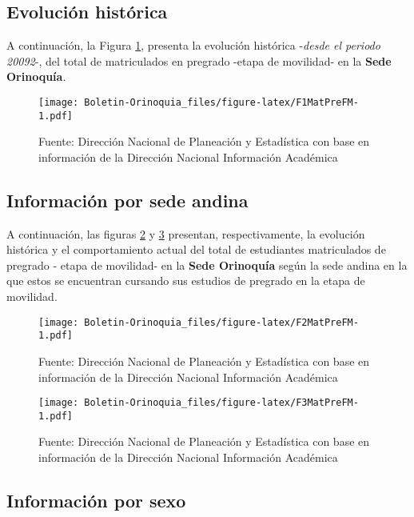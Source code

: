 \documentclass[
]{book}
\begin{document}
\hypertarget{evoluciuxf3n-histuxf3rica-4}{%
\subsection{Evolución histórica}\label{evoluciuxf3n-histuxf3rica-4}}

A continuación, la Figura \ref{fig:F1MatPreFM}, presenta la evolución histórica -\emph{desde el periodo 20092}-, del total de matriculados en pregrado -etapa de movilidad- en la \textbf{Sede Orinoquía}.

\begin{figure}
\centering
\texttt{[image: Boletin-Orinoquia\_files/figure-latex/F1MatPreFM-1.pdf]}
\caption{\label{fig:F1MatPreFM}Fuente: Dirección Nacional de Planeación y Estadística con base en información de la Dirección Nacional Información Académica}
\end{figure}

\hypertarget{informaciuxf3n-por-sede-andina-2}{%
\subsection{Información por sede andina}\label{informaciuxf3n-por-sede-andina-2}}

A continuación, las figuras \ref{fig:F2MatPreFM} y \ref{fig:F3MatPreFM} presentan, respectivamente, la evolución histórica y el comportamiento actual del total de estudiantes matriculados de pregrado - etapa de movilidad- en la \textbf{Sede Orinoquía} según la sede andina en la que estos se encuentran cursando sus estudios de pregrado en la etapa de movilidad.

\begin{figure}
\centering
\texttt{[image: Boletin-Orinoquia\_files/figure-latex/F2MatPreFM-1.pdf]}
\caption{\label{fig:F2MatPreFM}Fuente: Dirección Nacional de Planeación y Estadística con base en información de la Dirección Nacional Información Académica}
\end{figure}

\begin{figure}
\centering
\texttt{[image: Boletin-Orinoquia\_files/figure-latex/F3MatPreFM-1.pdf]}
\caption{\label{fig:F3MatPreFM}Fuente: Dirección Nacional de Planeación y Estadística con base en información de la Dirección Nacional Información Académica}
\end{figure}

\hypertarget{informaciuxf3n-por-sexo-4}{%
\subsection{Información por sexo}\label{informaciuxf3n-por-sexo-4}}
\end{document}
